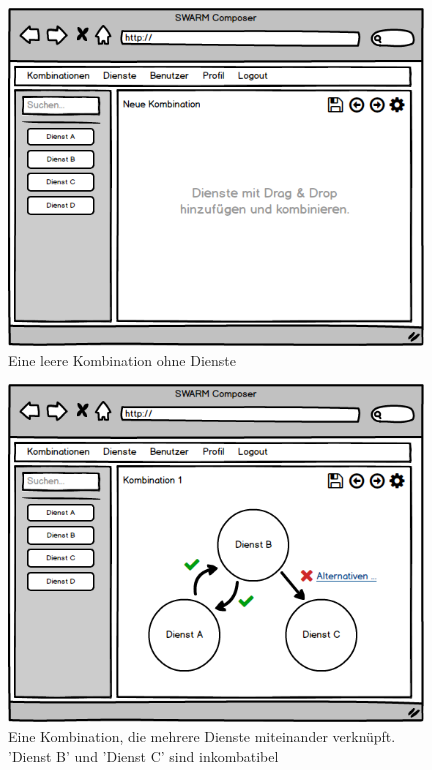 \begin{figure}[ht]
	\centering
	\includegraphics[keepaspectratio,width=11cm]{img/webfrontend/Kombinationen_Leer.png}
	\caption{Eine leere Kombination ohne Dienste}
\end{figure}

\begin{figure}[ht]
	\centering
	\includegraphics[keepaspectratio,width=11cm]{img/webfrontend/Kombinationen_Detail.png}
	\caption{Eine Kombination, die mehrere Dienste miteinander verknüpft. 'Dienst B' und 'Dienst C' sind inkombatibel}
\end{figure}

